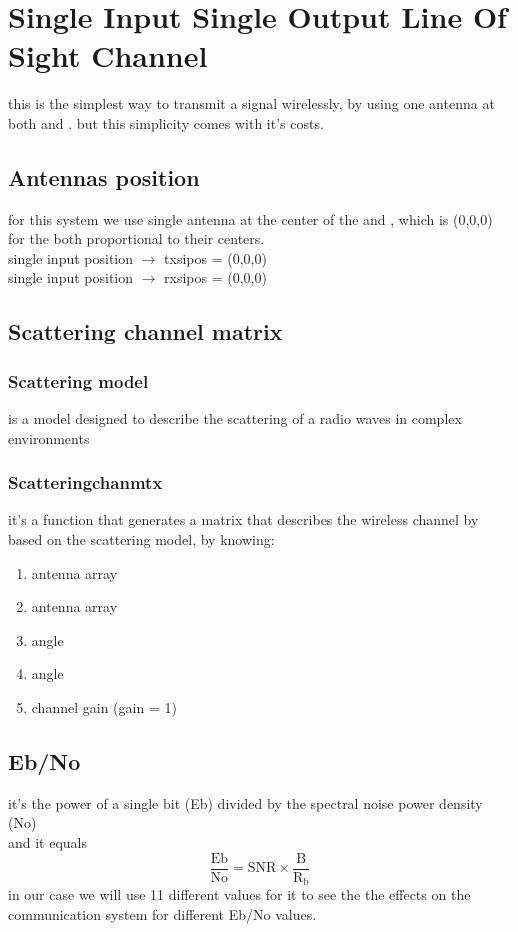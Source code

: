 \chapter{Single Input Single Output Line Of Sight Channel}

this is the simplest way to transmit a signal wirelessly, by using one antenna at both \Tx and \Rx. but this simplicity comes with it's costs.

\section{Antennas position}
for this system we use single antenna at the center of the \Tx and \Rx , which is (0,0,0) for the both proportional to their centers.\\
\Tx single input position $\to$ txsipos = (0,0,0)\\
\Rx single input position $\to$ rxsipos = (0,0,0)\\

\section{Scattering channel matrix}
\subsection{Scattering model}
is a model designed to describe the scattering of a radio waves in complex environments
\subsection{Scatteringchanmtx}
it's a function that generates a matrix that describes the wireless channel by based on the scattering model, by knowing:
\begin{enumerate}
	\item \Tx antenna array
	\item \Rx antenna array
	\item \Tx angle
	\item \Rx angle
	\item channel gain (gain = 1)
\end{enumerate}
\section{Eb/No}
it's the power of a single bit (Eb) divided by the spectral noise power density (No)\\
and it equals
$$
\frac{\text{Eb}}{\text{No}} = \text{SNR} \times \frac{\text{B}}{\text{R}_\text{b}}
$$
in our case we will use 11 different values for it to see the the effects on the communication system for different Eb/No values.

